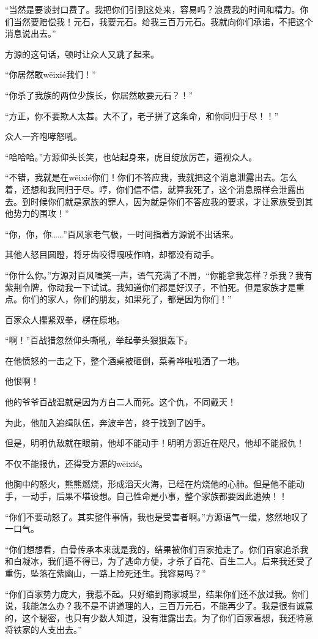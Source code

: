 \begin{this_body}
“当然是要谈封口费了。我把你们引到这处来，容易吗？浪费我的时间和精力。你们当然要赔偿我！元石，我要元石。给我三百万元石。我就向你们承诺，不把这个消息说出去。”

方源的这句话，顿时让众人又跳了起来。

“你居然敢wēixié我们！”

“你杀了我族的两位少族长，你居然敢要元石？！”

“方正，你不要欺人太甚。大不了，老子拼了这条命，和你同归于尽！！”

众人一齐咆哮怒吼。

“哈哈哈。”方源仰头长笑，也站起身来，虎目绽放厉芒，逼视众人。

“不错，我就是在wēixié你们！你们不答应我，我就把这个消息泄露出去。怎么着，还想和我同归于尽。哼，你们信不信，就算我死了，这个消息照样会泄露出去。到时候你们就是家族的罪人，因为就是你们不答应我的要求，才让家族受到其他势力的围攻！”

“你，你，你……”百风家老气极，一时间指着方源说不出话来。

其他人怒目圆瞪，将牙齿咬得嘎吱作响，却都没有动手。

“你什么你。”方源对百风嗤笑一声，语气充满了不屑，“你能拿我怎样？杀我？我有紫荆令牌，你动我一下试试。我知道你们都是好汉子，不怕死。但是家族才是重点。你们的家人，你们的朋友，如果死了，都是因为你们！”

百家众人攥紧双拳，楞在原地。

“啊！”百战猎忽然仰头嘶吼，举起拳头狠狠轰下。

在他愤怒的一击之下，整个酒桌被砸倒，菜肴哗啦啦洒了一地。

他恨啊！

他的爷爷百战温就是因为方白二人而死。这个仇，不同戴天！

为此，他加入追缉队伍，奔波辛苦，终于找到了凶手。

但是，明明仇敌就在眼前，他却不能动手！明明方源近在咫尺，他却不能报仇！

不仅不能报仇，还得受方源的wēixié。

他胸中的怒火，熊熊燃烧，形成滔天火海，已经在灼烧他的心肺。但是他不能动手，一动手，后果不堪设想。自己性命是小事，整个家族都要因此遭殃！！

“你们不要动怒了。其实整件事情，我也是受害者啊。”方源语气一缓，悠然地叹了一口气。

“你们想想看，白骨传承本来就是我的，结果被你们百家抢走了。你们百家追杀我和白凝冰，我们逼不得已，为了逃命方便，才杀了百花、百生二人。后来我还受了重伤，坠落在紫幽山，一路上险死还生。我容易吗？”

“你们百家势力庞大，我惹不起。只好缩到商家城里，结果你们还不放过我。你们说，我能怎么办？我不是不讲道理的人，三百万元石，不能再少了。我是很有诚意的，这个秘密，也只有少数人知道，没有泄露出去。为了你们百家着想，我还特意将铁家的人支出去。”


\end{this_body}
